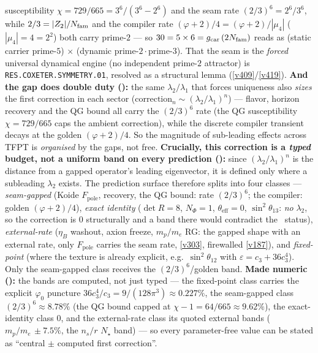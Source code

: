 susceptibility $\chi=729/665=3^6/(3^6{-}2^6)$ and the seam rate $(2/3)^6=2^6/3^6$, while $2/3=|Z_2|/N_{\mathrm{fam}}$ and the
compiler rate $(\varphi{+}2)/4=(\varphi{+}2)/|\mu_4|$ ($|\mu_4|{=}4{=}2^2$) both carry prime-$2$ --- so $30=5\times6
=g_{\mathrm{car}}\,(2N_{\mathrm{fam}})$ reads as (static carrier prime-$5$) $\times$ (dynamic prime-$2{\cdot}$prime-$3$). That the
seam is the \emph{forced} universal dynamical engine (no independent prime-$2$ attractor) is
\texttt{RES.COXETER.SYMMETRY.01}, resolved as a structural lemma (\vref{v409}/\vref{v419}). \textbf{And the gap does double duty ():} the same
$\lambda_2/\lambda_1$ that forces uniqueness also \emph{sizes} the first correction in each sector
($\mathrm{correction}_n\sim(\lambda_2/\lambda_1)^n$) --- flavor, horizon recovery and the QG bound all carry the
$(2/3)^6$ rate (the QG susceptibility $\chi=729/665$ caps the ambient correction), while the discrete compiler
transient decays at the golden $(\varphi+2)/4$. So the magnitude of sub-leading effects across TFPT is
\emph{organised} by the gaps, not free. \textbf{Crucially, this correction is a \emph{typed} budget, not a
uniform band on every prediction ():} since $(\lambda_2/\lambda_1)^n$ is the
distance from a gapped operator's leading eigenvector, it is defined only where a subleading $\lambda_2$ exists.
The prediction surface therefore splits into four classes --- \emph{seam-gapped} (Koide $F_{\mathrm{pole}}$,
recovery, the QG bound: rate $(2/3)^6$; the compiler: golden $(\varphi+2)/4$), \emph{exact identity}
($\det R=8$, $N_\Phi=1$, $\theta_{\mathrm{eff}}=0$, $\sin^2\theta_{13}$: \emph{no} $\lambda_2$, so the correction is
$0$ structurally and a band there would contradict the \mE\ status), \emph{external-rate} ($\eta_B$ washout,
axion freeze, $m_p/m_e$ RG: the gapped shape with an external rate, only $F_{\mathrm{pole}}$ carries the seam rate,
\vref{v303}, firewalled \vref{v187}), and \emph{fixed-point} (where the texture is already explicit, e.g.\
$\sin^2\theta_{12}$ with $\varepsilon=c_3+36c_3^4$). Only the seam-gapped class receives the $(2/3)^6$/golden band.
\textbf{Made numeric (\veri{v393\_corrections\_numeric.py}):} the bands are computed, not just typed --- the
fixed-point class carries the explicit $\varphi_0$ puncture $36c_3^4/c_3=9/(128\pi^3)\approx0.227\%$, the seam-gapped
class $(2/3)^6\approx8.78\%$ (the QG bound capped at $\chi-1=64/665\approx9.62\%$), the exact-identity class $0$, and the
external-rate class its quoted external bands ($m_p/m_e\,{\pm}7.5\%$, the $n_s/r$ $N_\star$ band) --- so every
parameter-free value can be stated as ``central $\pm$ computed first correction''.

